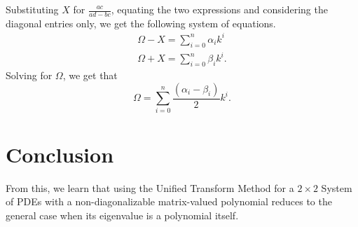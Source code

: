 \documentclass{article}
\begin{document}
Substituting $X$ for $\frac{ac}{ad-bc}$, equating the two expressions and considering the diagonal entries only, we get the following system of equations.
\begin{align*}
    \Omega - X = \sum_{i=0}^{n}\alpha_ik^i \\
    \Omega + X = \sum_{i=0}^{n}\beta_ik^i.
\end{align*}
Solving for $\Omega$, we get that
$$\Omega = \sum_{i=0}^{n}\frac{(\alpha_i - \beta_i)}{2}k^i.$$

\section{Conclusion}
From this, we learn that using the Unified Transform Method for a $2 \times 2$ System of PDEs with a non-diagonalizable matrix-valued polynomial reduces to the general case when its eigenvalue is a polynomial itself. 
\end{document}
